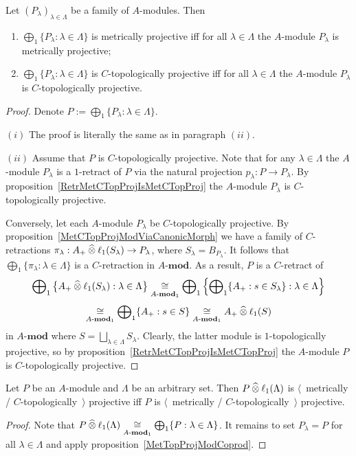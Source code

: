 \begin{proposition}\label{MetTopProjModCoprod} Let
${(P_\lambda)}_{\lambda\in\Lambda}$ be a family of $A$-modules. Then 
\begin{enumerate}[label = (\roman*)]
    \item $\bigoplus_1 \{P_\lambda:\lambda\in\Lambda \}$ is metrically
    projective iff for all $\lambda\in\Lambda$ the $A$-module $P_\lambda$ is
    metrically projective;

    \item $\bigoplus_1 \{P_\lambda:\lambda\in\Lambda \}$ is $C$-topologically
    projective iff for all $\lambda\in\Lambda$ the $A$-module $P_\lambda$ is
    $C$-topologically projective.
\end{enumerate}
\end{proposition}
\begin{proof} Denote $P:=\bigoplus_1 \{P_\lambda:\lambda\in\Lambda \}$.

$(i)$ The proof is literally the same as in paragraph $(ii)$.

$(ii)$ Assume that $P$ is $C$-topologically projective. Note that for any
$\lambda\in\Lambda$ the $A$-module $P_\lambda$ is a $1$-retract of $P$ via
the natural projection $p_\lambda:P\to P_\lambda$. By
proposition~\ref{RetrMetCTopProjIsMetCTopProj} the $A$-module $P_\lambda$ is
$C$-topologically projective.

Conversely, let each $A$-module $P_\lambda$ be $C$-topologically projective. By
proposition~\ref{MetCTopProjModViaCanonicMorph} we have a family 
of $C$-retractions $\pi_\lambda:A_+\mathbin{\widehat{\otimes}}\ell_1(S_\lambda)\to P_\lambda$, where $S_\lambda=B_{P_\lambda}$. 
It follows that
$\bigoplus_1 \{\pi_\lambda:\lambda\in\Lambda \}$ is a $C$-retraction in
$A\text{-}\mathbf{mod}$. As a result, $P$ is a $C$-retract of 
\[
\bigoplus\nolimits_1\left \{A_+\mathbin{\widehat{\otimes}}
\ell_1(S_\lambda):\lambda\in\Lambda\right \} \mathrel{\mathop{\cong}\limits_{A\text{-}\mathbf{mod}_1}}
\bigoplus\nolimits_1\left \{\bigoplus\nolimits_1 \{A_+:s\in S_\lambda
\}:\lambda\in\Lambda\right \}
\]
\[
\mathrel{\mathop{\cong}\limits_{A\text{-}\mathbf{mod}_1}} \bigoplus\nolimits_1 \{A_+:s\in S \}
\mathrel{\mathop{\cong}\limits_{A\text{-}\mathbf{mod}_1}} A_+ \mathbin{\widehat{\otimes}} \ell_1(S)
\]
in $A\text{-}\mathbf{mod}$ where $S=\bigsqcup_{\lambda\in\Lambda}S_\lambda$. Clearly,
the latter module is $1$-topologically projective, so by
proposition~\ref{RetrMetCTopProjIsMetCTopProj} the $A$-module $P$ is 
$C$-topologically projective.
\end{proof}

\begin{corollary}\label{MetTopProjTensProdWithl1} Let $P$ be an $A$-module and
$\Lambda$ be an arbitrary set. Then $P\mathbin{\widehat{\otimes}} \ell_1(\Lambda)$ is
$\langle$~metrically / $C$-topologically~$\rangle$ projective iff $P$ is
$\langle$~metrically / $C$-topologically~$\rangle$ projective.
\end{corollary}
\begin{proof} 
Note that 
$P\mathbin{\widehat{\otimes}} \ell_1(\Lambda)
\mathrel{\mathop{\cong}\limits_{A\text{-}\mathbf{mod}_1}}
\bigoplus_1 \{P:\lambda\in\Lambda \}$. It remains to set $P_\lambda=P$ for all
$\lambda\in\Lambda$ and apply proposition~\ref{MetTopProjModCoprod}.
\end{proof}


